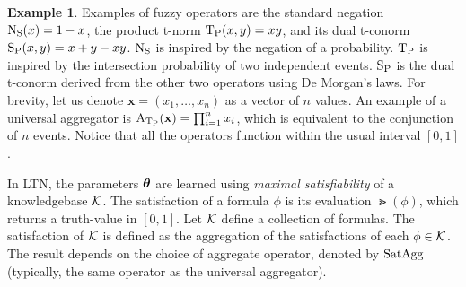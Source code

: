 \documentclass{article}
\theoremstyle{definition}
\newtheorem{example}{Example}
\begin{document}
\begin{example}
    \label{ex:tnorm}
    Examples of fuzzy operators are
    the standard negation $\operatorname{N_{S}}(x)=1-x$, 
    the product t-norm $\operatorname{T_{P}}(x,y)=xy$, 
    and its dual t-conorm $\operatorname{S_{P}}(x,y)=x+y-xy$.
    $\operatorname{N_{S}}$ is inspired by the negation of a probability.
    $\operatorname{T_{P}}$ is inspired by the intersection probability of two independent events.
    $\operatorname{S_{P}}$ is the dual t-conorm derived from the other two operators using De Morgan's laws.
    For brevity, let us denote $\mathbf{x} = (x_1, \dots, x_n)$ as a vector of $n$ values.
    An example of a universal aggregator is $\operatorname{A_{\operatorname{T_{P}}}}(\mathbf{x}) = \prod_{i=1}^{n} x_i$, which is equivalent to the conjunction of $n$ events.
    Notice that all the operators function within the usual interval $[0,1]$.
\end{example}

\label{s:ltn_optimization}

In LTN, the parameters $\boldsymbol{\theta}$ are learned using \emph{maximal satisfiability} of a knowledgebase $\mathcal{K}$.
The satisfaction of a formula $\phi$ is its evaluation $\Gt(\phi)$, which returns a truth-value in $[0,1]$.
Let $\mathcal{K}$ define a collection of formulas.
The satisfaction of $\mathcal{K}$ is defined as the aggregation of the satisfactions of each $\phi \in \mathcal{K}$.
The result depends on the choice of aggregate operator, denoted by $\operatorname*{SatAgg}$ (typically, the same operator as the universal aggregator).
\end{document}
